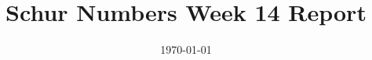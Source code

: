 \documentclass[12pt]{article}
\begin{document}
\title{Schur Numbers Week 14 Report}
\date{\today}

\tableofcontents
\newpage
\maketitle
\end{document}
